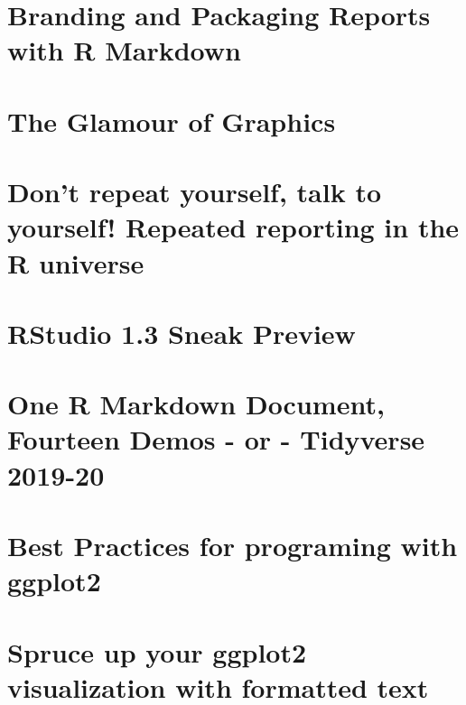 \documentclass[]{book}
\begin{document}
\hypertarget{branding-and-packaging-reports-with-r-markdown}{%
\section{Branding and Packaging Reports with R Markdown}\label{branding-and-packaging-reports-with-r-markdown}}

\hypertarget{the-glamour-of-graphics}{%
\section{The Glamour of Graphics}\label{the-glamour-of-graphics}}

\hypertarget{dont-repeat-yourself-talk-to-yourself-repeated-reporting-in-the-r-universe}{%
\section{Don't repeat yourself, talk to yourself! Repeated reporting in the R universe}\label{dont-repeat-yourself-talk-to-yourself-repeated-reporting-in-the-r-universe}}

\hypertarget{rstudio-1.3-sneak-preview}{%
\section{RStudio 1.3 Sneak Preview}\label{rstudio-1.3-sneak-preview}}

\hypertarget{one-r-markdown-document-fourteen-demos---or---tidyverse-2019-20}{%
\section{One R Markdown Document, Fourteen Demos - or - Tidyverse 2019-20}\label{one-r-markdown-document-fourteen-demos---or---tidyverse-2019-20}}

\hypertarget{best-practices-for-programing-with-ggplot2}{%
\section{Best Practices for programing with ggplot2}\label{best-practices-for-programing-with-ggplot2}}

\hypertarget{spruce-up-your-ggplot2-visualization-with-formatted-text}{%
\section{Spruce up your ggplot2 visualization with formatted text}\label{spruce-up-your-ggplot2-visualization-with-formatted-text}}
\end{document}
